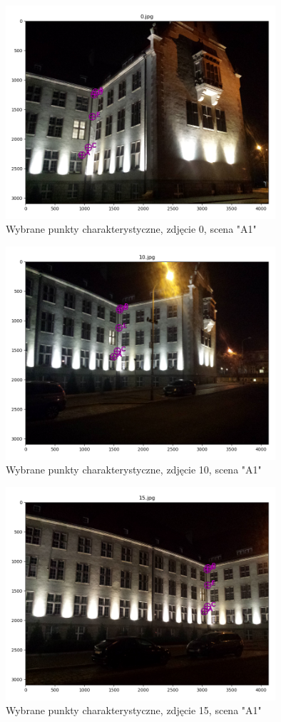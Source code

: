 \begin{figure}[h]
   \centering
   \includegraphics[width=10cm]{feature_A1/img_0.png}
   \caption{Wybrane punkty charakterystyczne, zdjęcie 0, scena "A1"}
   \label {fig:feature_A1_img_0}
\end{figure}
\begin{figure}[h]
   \centering
   \includegraphics[width=10cm]{feature_A1/img_10.png}
   \caption{Wybrane punkty charakterystyczne, zdjęcie 10, scena "A1"}
   \label {fig:feature_A1_img_10}
\end{figure}
\begin{figure}[h]
   \centering
   \includegraphics[width=10cm]{feature_A1/img_15.png}
   \caption{Wybrane punkty charakterystyczne, zdjęcie 15, scena "A1"}
   \label {fig:feature_A1_img_15}
\end{figure}
